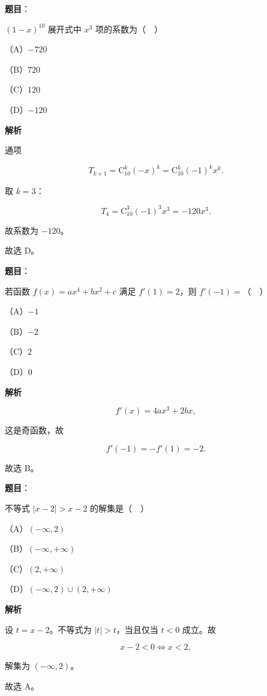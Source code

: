 \begin{answer}

\textbf{题目}：

$(1-x)^{10}$ 展开式中 $x^3$ 项的系数为（　）

（A）$-720$

（B）$720$

（C）$120$

（D）$-120$

\textbf{解析}

通项

\nopagebreak[4]
\[T_{k+1}=\mathrm C_{10}^k(-x)^k=\mathrm C_{10}^k(-1)^kx^k.\]

取 $k=3$：

\nopagebreak[4]
\[T_4=\mathrm C_{10}^3(-1)^3x^3=-120x^3.\]

故系数为 $-120$。

故选 D。


\end{answer}
\begin{answer}

\textbf{题目}：

若函数 $f(x)=ax^4+bx^2+c$ 满足 $f'(1)=2$，则 $f'(-1)=$（　）

（A）$-1$

（B）$-2$

（C）$2$

（D）$0$

\textbf{解析}

\nopagebreak[4]
\[f'(x)=4ax^3+2bx,\]

这是奇函数，故

\nopagebreak[4]
\[f'(-1)=-f'(1)=-2.\]

故选 B。


\end{answer}
\begin{answer}

\textbf{题目}：

不等式 $|x-2|>x-2$ 的解集是（　）

（A）$(-\infty,2)$

（B）$(-\infty,+\infty)$

（C）$(2,+\infty)$

（D）$(-\infty,2)\cup(2,+\infty)$

\textbf{解析}

设 $t=x-2$。不等式为 $|t|>t$，当且仅当 $t<0$ 成立。故

\nopagebreak[4]
\[x-2<0\iff x<2,\]

解集为 $(-\infty,2)$。

故选 A。


\end{answer}
